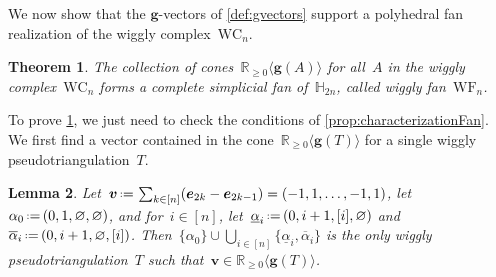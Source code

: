\documentclass{amsart}
\newtheorem{theorem}{Theorem}%
\newtheorem{lemma}[theorem]{Lemma}
\theoremstyle{definition}
\newcommand{\R}{\mathbb{R}} %
\newcommand{\HH}{\mathbb{H}} %
\renewcommand{\b}[1]{{\boldsymbol{#1}}} %
\newcommand{\eqdef}{\mbox{\,\raisebox{0.2ex}{\scriptsize\ensuremath{\mathrm:}}\ensuremath{=}\,}} %
\newcommand{\darkblue}{\color{darkblue}} %
\newcommand{\defn}[1]{\textsl{\darkblue #1}} %
\newcommand{\wigglyComplex}{\mathrm{WC}} %
\newcommand{\wigglyFan}{\mathrm{WF}} %
\begin{document}
We now show that the $\b{g}$-vectors of \cref{def:gvectors} support a polyhedral fan realization of the wiggly complex~$\wigglyComplex_n$.

\begin{theorem}
\label{thm:wigglyFan}
The collection of cones~$\R_{\ge 0} \langle \b{g}(A) \rangle$ for all~$A$ in the wiggly complex~$\wigglyComplex_n$ forms a complete simplicial fan of~$\HH_{2n}$, called \defn{wiggly fan}~$\wigglyFan_n$.
\end{theorem}

To prove \cref{thm:wigglyFan}, we just need to check the conditions of \cref{prop:characterizationFan}.
We first find a vector contained in the cone~$\R_{\ge 0} \langle \b{g}(T) \rangle$ for a single wiggly pseudotriangulation~$T$.

\begin{lemma}
\label{lem:-+...-+}
Let~$\b{v} \eqdef \sum_{k \in [n]} (\b{e}_{2k} - \b{e}_{2k-1}) = (-1, 1, \dots, -1, 1)$, let~$\alpha_0 \eqdef (0, 1, \varnothing, \varnothing)$, and for~${i \in [n]}$, let~$\underline{\alpha}_i \eqdef (0, i+1, [i], \varnothing)$ and~$\overline{\alpha}_i \eqdef (0, i+1, \varnothing, [i])$.
Then~$\{\alpha_0\} \cup \bigcup_{i \in [n]} \{\underline{\alpha}_i, \overline{\alpha}_i\}$ is the only wiggly pseudotriangulation~$T$ such that~$\b{v} \in \R_{\ge 0} \langle \b{g}(T) \rangle$.
\end{lemma}
\end{document}

